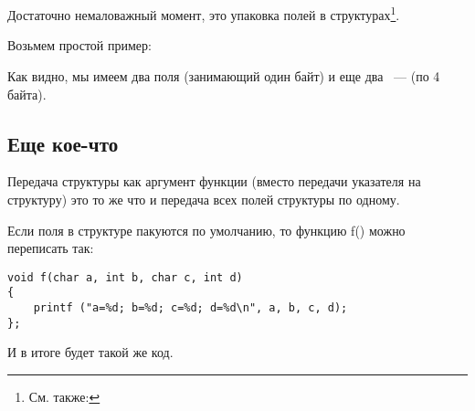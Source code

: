 \section{\StructurePackingSectionName}
\label{structure_packing}

Достаточно немаловажный момент, это упаковка полей в структурах\footnote{См. также: \URLWPDA}.

Возьмем простой пример:



Как видно, мы имеем два поля \Tchar (занимающий один байт) и еще два ~--- \Tint (по 4 байта).





\subsection{Еще кое-что}

Передача структуры как аргумент функции (вместо передачи указателя на структуру) это то же
что и передача всех полей структуры по одному.

Если поля в структуре пакуются по умолчанию, то функцию f() можно переписать так:

\begin{lstlisting}
void f(char a, int b, char c, int d)
{
    printf ("a=%d; b=%d; c=%d; d=%d\n", a, b, c, d);
};
\end{lstlisting}

И в итоге будет такой же код.
